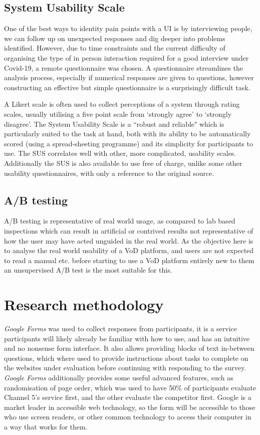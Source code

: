 \documentclass[12pt,a4paper,x11names]{article}
\begin{document}
\subsection{System Usability Scale}
One of the best ways to identity pain points with a UI is by interviewing people, we can follow up on unexpected responses and dig deeper into problems identified. However, due to time constraints and the current difficulty of organising the type of in person interaction required for a good interview under Covid-19, a remote questionnaire was chosen. A questionnaire streamlines the analysis process, especially if numerical responses are given to questions, however constructing an effective but simple questionnaire is a surprisingly difficult task\cite{designing-user-experience}. 

A Likert scale\cite{likert1932} is often used to collect perceptions of a system through rating scales, usually utilising a five point scale from `strongly agree' to `strongly disagree'. The System Usability Scale is a ``robust and reliable"\cite{sus} which is particularly suited to the task at hand, both with its ability to be automatically scored (using a spread-sheeting programme) and its simplicity for participants to use. The SUS correlates well with other, more complicated, usability scales. Additionally the SUS is also available to use free of charge, unlike some other usability questionnaires, with only a reference to the original source.

\subsection{A/B testing}
A/B testing is representative of real world usage, as compared to lab based inspections which can result in artificial or contrived results not representative of how the user may have acted unguided in the real world\cite{firmenich2019usability}. As the objective here is to analyse the real world usability of a VoD platform, and users are not expected to read a manual etc. before starting to use a VoD platform entirely new to them an unsupervised A/B test is the most suitable for this. 

\section{Research methodology}
\textit{Google Forms} was used to collect responses from participants, it is a service participants will likely already be familiar with how to use, and has an intuitive and no nonsense form interface. It also allows providing blocks of text in-between questions, which where used to provide instructions about tasks to complete on the websites under evaluation before continuing with responding to the survey. \textit{Google Forms} additionally provides some useful advanced features, such as randomisation of page order, which was used to have 50\% of participants evaluate Channel 5's service first, and the other evaluate the competitor first. Google is a market leader in accessible web technology, so the form will be accessible to those who use screen readers, or other common technology to access their computer in a way that works for them.
\end{document}
